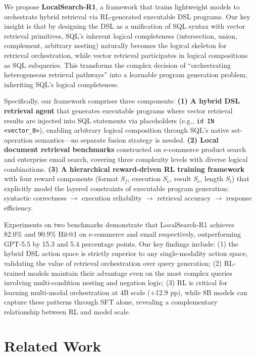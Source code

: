 \documentclass[11pt]{article}
\begin{document}
We propose \textbf{LocalSearch-R1}, a framework that trains lightweight models to orchestrate hybrid retrieval via RL-generated executable DSL programs.
Our key insight is that by designing the DSL as a unification of SQL syntax with vector retrieval primitives, SQL's inherent logical completeness (intersection, union, complement, arbitrary nesting) naturally becomes the logical skeleton for retrieval orchestration, while vector retrieval participates in logical compositions as SQL subqueries.
This transforms the complex decision of ``orchestrating heterogeneous retrieval pathways'' into a learnable program generation problem, inheriting SQL's logical completeness.

Specifically, our framework comprises three components:
\textbf{(1) A hybrid DSL retrieval agent} that generates executable programs where vector retrieval results are injected into SQL statements via placeholders (e.g., \texttt{id IN <vector\_0>}), enabling arbitrary logical composition through SQL's native set-operation semantics---no separate fusion strategy is needed.
\textbf{(2) Local document retrieval benchmarks} constructed on e-commerce product search and enterprise email search, covering three complexity levels with diverse logical combinations.
\textbf{(3) A hierarchical reward-driven RL training framework} with four reward components (format $S_f$, execution $S_e$, result $S_r$, length $S_l$) that explicitly model the layered constraints of executable program generation: syntactic correctness $\to$ execution reliability $\to$ retrieval accuracy $\to$ response efficiency.

Experiments on two benchmarks demonstrate that LocalSearch-R1 achieves 82.0\% and 90.9\% Hit@1 on e-commerce and email respectively, outperforming GPT-5.5 by 15.3 and 5.4 percentage points.
Our key findings include:
(1) the hybrid DSL action space is strictly superior to any single-modality action space, validating the value of retrieval orchestration over query generation;
(2) RL-trained models maintain their advantage even on the most complex queries involving multi-condition nesting and negation logic;
(3) RL is critical for learning multi-modal orchestration at 4B scale (+12.9 pp), while 8B models can capture these patterns through SFT alone, revealing a complementary relationship between RL and model scale.


\section{Related Work}
\label{sec:related}
\end{document}
